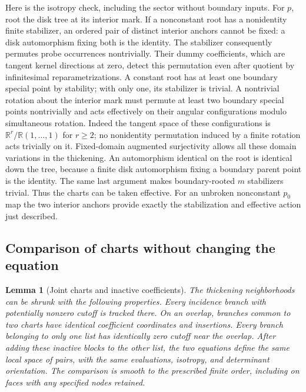 \documentclass[11pt]{article}
\newtheorem{lemma}[theorem]{Lemma}
\theoremstyle{definition}
\theoremstyle{remark}
\numberwithin{equation}{section}
\begin{document}
Here is the isotropy check, including the sector without boundary inputs.
For $p$, root the disk tree at its interior mark.  If a nonconstant root
has a nonidentity finite stabilizer, an ordered pair of distinct interior
anchors cannot be fixed: a disk automorphism fixing both is the identity.
The stabilizer consequently permutes probe occurrences nontrivially.
Their dummy coefficients, which are tangent kernel directions at zero,
detect this permutation even after quotient by infinitesimal
reparametrizations.  A constant root has at least one boundary special
point by stability; with only one, its stabilizer is trivial.  A
nontrivial rotation about the interior mark must permute at least two
boundary special points nontrivially and acts effectively on their
angular configurations modulo simultaneous rotation.  Indeed the tangent
space of these configurations is $\mathbb R^r/\mathbb R(1,\ldots,1)$ for $r\ge2$;
no nonidentity permutation induced by a finite rotation acts trivially
on it.  Fixed-domain augmented surjectivity allows all these domain
variations in the thickening.  An automorphism identical on the root is
identical down the tree, because a finite disk automorphism fixing a
boundary parent point is the identity.  The same last argument makes
boundary-rooted $m$ stabilizers trivial.  Thus the charts can be taken
effective.  For an unbroken nonconstant $p_0$ map the two interior anchors
provide exactly the stabilization and effective action just described.

\subsection{Comparison of charts without changing the equation}

\begin{lemma}[Joint charts and inactive coefficients]\label{virt:joint-charts}
The thickening neighborhoods can be shrunk with the following properties.
Every incidence branch with potentially nonzero cutoff is tracked there.
On an overlap, branches common to two charts have identical coefficient
coordinates and insertions.  Every branch belonging to only one list has
identically zero cutoff near the overlap.  After adding these inactive
blocks to the other list, the two equations define the same local space
of pairs, with the same evaluations, isotropy, and determinant orientation.
The comparison is smooth to the prescribed finite order, including on
faces with any specified nodes retained.
\end{lemma}
\end{document}
